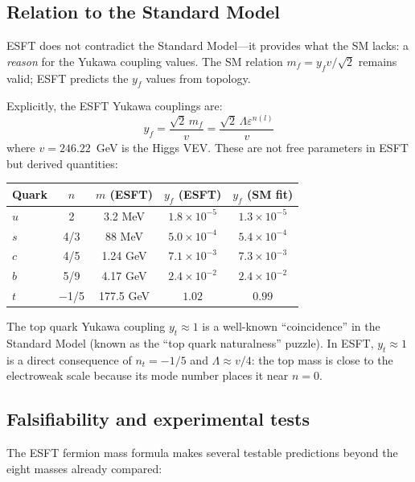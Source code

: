 ﻿\documentclass[twocolumn,preprintnumbers,amsmath,amssymb,prd]{revtex4-2}
\begin{document}
\subsection{Relation to the Standard Model}

ESFT does not contradict the Standard Model---it provides what the SM lacks: a \emph{reason} for the Yukawa coupling values. The SM relation $m_f = y_f v/\sqrt{2}$ remains valid; ESFT predicts the $y_f$ values from topology.

Explicitly, the ESFT Yukawa couplings are:
\begin{equation}
y_f = \frac{\sqrt{2}\,m_f}{v} = \frac{\sqrt{2}\,\Lambda\varepsilon^{n(l)}}{v}
\end{equation}
where $v = 246.22$~GeV is the Higgs VEV. These are not free parameters in ESFT but derived quantities:

\begin{center}
\begin{tabular}{lcccc}
Quark & $n$ & $m$ (ESFT) & $y_f$ (ESFT) & $y_f$ (SM fit) \\ \hline
$u$ & 2 & 3.2 MeV & $1.8 \times 10^{-5}$ & $1.3 \times 10^{-5}$ \\
$s$ & 4/3 & 88 MeV & $5.0 \times 10^{-4}$ & $5.4 \times 10^{-4}$ \\
$c$ & 4/5 & 1.24 GeV & $7.1 \times 10^{-3}$ & $7.3 \times 10^{-3}$ \\
$b$ & 5/9 & 4.17 GeV & $2.4 \times 10^{-2}$ & $2.4 \times 10^{-2}$ \\
$t$ & $-$1/5 & 177.5 GeV & $1.02$ & $0.99$ \\
\end{tabular}
\end{center}

The top quark Yukawa coupling $y_t \approx 1$ is a well-known ``coincidence'' in the Standard Model (known as the ``top quark naturalness'' puzzle). In ESFT, $y_t \approx 1$ is a direct consequence of $n_t = -1/5$ and $\Lambda \approx v/4$: the top mass is close to the electroweak scale because its mode number places it near $n = 0$.

\subsection{Falsifiability and experimental tests}

The ESFT fermion mass formula makes several testable predictions beyond the eight masses already compared:
\end{document}

